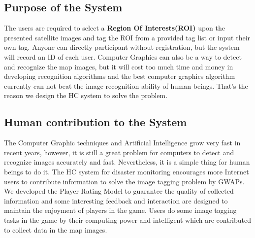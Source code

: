 \subsection{Purpose of the System}
The users are required to select a \textbf{Region Of Interests(ROI)} upon the presented satellite images 
and tag the ROI from a provided tag list or input their own tag. Anyone can directly participant 
without registration, but the system will record an ID of each user.
Computer Graphics can also be a way to detect and recognize the map images, but it will cost 
too much time and money in developing recognition algorithms and the best 
computer graphics algorithm currently can not beat the image recognition ability of human beings. 
That's the reason we design the HC system to solve the problem.

\subsection{Human contribution to the System}
The Computer Graphic techniques and Artificial Intelligence grow very fast in recent years, 
however, it is still a great problem for computers to detect and recognize images accurately and fast.
Nevertheless, it is a simple thing for human beings to do it.
The HC system for disaster monitoring encourages more Internet users to contribute information 
to solve the image tagging problem by GWAPs. 
We developed the Player Rating Model to guarantee the quality of collected information 
and some interesting feedback and interaction are designed to maintain the enjoyment of players in the game.
Users do some image tagging tasks in the game by their computing power and intelligent 
which are contributed to collect data in the map images.

